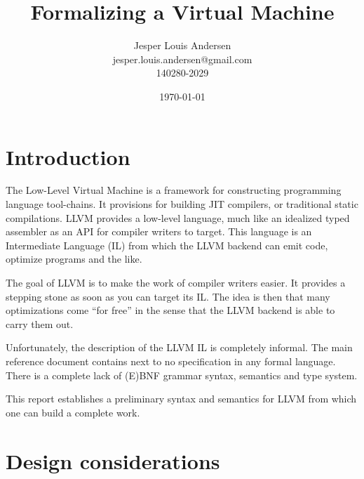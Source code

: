 \documentclass[a4paper, oneside, 10pt, draft]{memoir}
\author{Jesper Louis
  Andersen\\jesper.louis.andersen@gmail.com\\140280-2029}
\title{Formalizing a Virtual Machine}
\date{\today}
\begin{document}
\maketitle{}
\tableofcontents{}
\chapter{Introduction}

The Low-Level Virtual Machine \cite{llvm:homepage} is a framework for
constructing programming language tool-chains. It provisions for
building JIT compilers, or traditional static compilations. LLVM
provides a low-level language, much like an idealized typed assembler
as an API for compiler writers to target. This language is an
Intermediate Language (IL) from which the LLVM backend can emit code,
optimize programs and the like.

The goal of LLVM is to make the work of compiler writers easier. It
provides a stepping stone as soon as you can target its IL. The idea
is then that many optimizations come ``for free'' in the sense that
the LLVM backend is able to carry them out.

Unfortunately, the description of the LLVM IL is completely
informal. The main reference document \cite{llvm:reference} contains
next to no specification in any formal language. There is a complete
lack of (E)BNF grammar syntax, semantics and type system.

This report establishes a preliminary syntax and semantics for LLVM
from which one can build a complete work.

\chapter{Design considerations}



\end{document}

